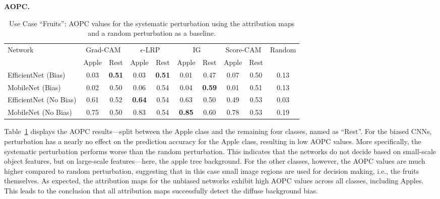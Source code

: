 \documentclass[runningheads]{llncs}
\newcommand{\Tab}[1]{Table~\ref{#1}}
\begin{document}
\textbf{AOPC.}
\begin{table}[t]
\begin{center}
\caption{Use Case \enquote{Fruits}: AOPC values for the systematic perturbation using the attribution maps and a random perturbation as a baseline.}
\begin{tabular}{l|| cc | cc | cc | cc | c}
     \multirow{2}{*}{Network}
     & \multicolumn{2}{c|}{Grad-CAM} & \multicolumn{2}{c|}{$\epsilon$-LRP} & \multicolumn{2}{c|}{IG}  & \multicolumn{2}{c|}{Score-CAM} & \multirow{2}{*}{Random} \\ \cline{2-9}
                   & Apple & Rest & Apple & Rest & Apple & Rest & Apple & Rest &  \\  \hline \hline
      EfficientNet (Bias) & 0.03  & \textbf{0.51} & 0.03  & \textbf{0.51} & 0.01  & 0.47 & 0.07  & 0.50 & 0.13 \\
      MobileNet (Bias) & 0.02  & 0.50 & 0.06  & 0.54 & 0.04  & \textbf{0.59} & 0.01  & 0.51 & 0.13 \\ \hline
       EfficientNet (No Bias) & 0.61  & 0.52 & \textbf{0.64}  & 0.54 & 0.63  & 0.50 & 0.49  & 0.53 & 0.03 \\
       MobileNet (No Bias) & 0.75  & 0.50 & 0.83  & 0.54 & \textbf{0.85}  & 0.60 & 0.78  & 0.53 & 0.19 \\
     \hline
\end{tabular}
\label{tab:aopc-fruits}
\vspace{-6mm}
\end{center}
\end{table}
\Tab{tab:aopc-fruits} displays the AOPC results---split between the Apple class and the remaining four classes, named as \enquote{Rest}. For the biased CNNs, perturbation has a nearly no effect on the prediction accuracy for the Apple class, resulting in low AOPC values. More specifically, the systematic perturbation performs worse than the random perturbation. This indicates that the networks do not decide based on small-scale object features, but on large-scale features---here, the apple tree background. For the other classes, however, the AOPC values are much higher compared to random perturbation, suggesting that in this case small image regions are used for decision making, i.e., the fruits themselves. As expected, the attribution maps for the unbiased networks exhibit high AOPC values across all classes, including Apples. This leads to the conclusion that all attribution maps successfully detect the diffuse background bias.
\end{document}
